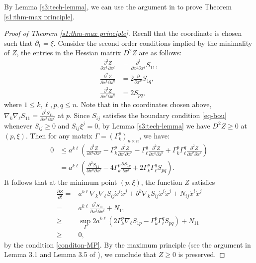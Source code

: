 \documentclass[11pt,reqno]{amsart}
\theoremstyle{definition}
\theoremstyle{remark}
\numberwithin{equation}{section}
\renewcommand{\(}{\left(}
\renewcommand{\)}{\right)}
\renewcommand{\-}{\overline}
\begin{document}
By Lemma \ref{s3:tech-lemma}, we can use the argument in \cite[\S 3]{And2007} to prove Theorem \ref{s1:thm-max principle}.
\begin{proof}[Proof of Theorem \ref{s1:thm-max principle}]
Recall that the coordinate is chosen such that $\partial_1=\xi$. Consider the second order conditions implied by the minimality of $Z$, the entries in the Hessian matrix $D^2Z$ are as follows:
	\begin{align*}
	\frac{\partial^2 Z}{\partial x^k \partial x^\ell}&=\frac{\partial^2}{\partial x^k \partial x^\ell} S_{11},\\
	\frac{\partial^2 Z}{\partial x^k \partial \dot{x}^q}&=2\frac{\partial}{\partial x^k} S_{1q},\\
	\frac{\partial^2 Z}{\partial \dot{x}^p \partial \dot{x}^q}&=2 S_{pq},
	\end{align*}
where $1\leq k,\ell,p,q\leq n$.	Note that in the coordinates chosen above, $\nabla_k\nabla_\ell S_{11}=\frac{\partial^2S_{11}}{\partial x^k \partial x^\ell}$ at $p$. Since $S_{ij}$ satisfies the boundary condition \eqref{eq-bou} whenever $S_{ij}\geq 0$ and $S_{ij}\xi^j=0$, by Lemma \ref{s3:tech-lemma} we have $D^2Z\geq 0$ at $(p,\xi)$. Then for any matrix $\Gamma=(\Gamma_k^p)_{n\times n}$, we have:
	\begin{align*}
	0&\leq a^{k\ell}\(\frac{\partial^2 Z}{\partial x^k \partial x^\ell}-\Gamma_k^p\frac{\partial^2 Z}{\partial x^\ell \partial \dot{x}^p}-\Gamma_\ell^q \frac{\partial^2 Z}{\partial x^k \partial \dot{x}^q}+\Gamma_k^p\Gamma_\ell^q\frac{\partial^2 Z}{\partial \dot{x}^p \partial \dot{x}^q}\)\\
	&=a^{k\ell}\(\frac{\partial^2 S_{11}}{\partial x^k \partial x^\ell}-4\Gamma_k^p\frac{\partial S_{1p}}{\partial x^\ell}+2\Gamma_k^p\Gamma_\ell^q S_{pq}\).
	\end{align*}
	It follows that at the minimum point $(p,\xi)$, the function $Z$ satisfies
	\begin{align*}
	\frac{\partial Z}{\partial t}=&a^{k\ell}\nabla_k\nabla_\ell S_{ij}\dot{x}^i\dot{x}^j+b^k\nabla_kS_{ij}\dot{x}^i\dot{x}^j+N_{ij}\dot{x}^i\dot{x}^j\\
	=&a^{k\ell}\frac{\partial^2S_{11}}{\partial x^k \partial x^\ell}+N_{11}\\
	\geq&\sup_{\Gamma}2a^{k\ell}\left(2\Gamma_k^p\nabla_\ell S_{1p}-\Gamma_k^p\Gamma_\ell^qS_{pq}\right)+N_{11}\\
	\geq&0,
	\end{align*}
by the condition \eqref{conditon-MP}.	By the maximum principle (see the argument in Lemma 3.1 and Lemma 3.5 of \cite{Hamilton}), we conclude that $Z\geq 0$ is preserved.
\end{proof}
\end{document}
